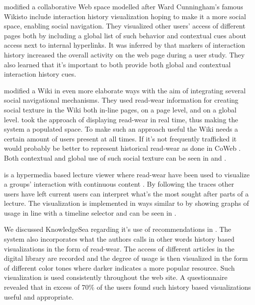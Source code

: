 \citet{dieberger00a} modified \dash{}a collaborative Web space
modelled after Ward Cunningham's famous Wikis\dash{}to include interaction
history visualization hoping to make it a more social space, enabling social
navigation. They visualized other users' access of different pages both by
including a global list of such behavior and contextual cues about access
next to internal hyperlinks.
It was inferred by \citeauthor{dieberger00a} that markers of interaction
history increased the overall activity on the web page during a user study.
They also learned that it's important to both provide both global and
contextual interaction history cues.

\citet{xu06} modified a Wiki in even more elaborate ways
with the aim of integrating several social navigational mechanisms.
They used read-wear information for creating social
texture in the Wiki both in-line pages, on a page level, and on a global
level. \citeauthor{xu06} took the approach of displaying read-wear in real
time, thus making the system a populated space. To make such an approach
useful the Wiki needs a certain amount of users present at all times. If
it's not frequently trafficked it would probably be better to represent
historical read-wear as done in CoWeb \citep[]{dieberger00a}. Both
contextual and global use of such social texture can be seen in
 and .

 is a hypermedia based lecture viewer where read-wear
have been used to visualize a groups' interaction with continuous content
\citep{mertens06}. By following the traces other users have left current users
can interpret what's the most sought after parts of a lecture. The
visualization is implemented in ways similar to \citet{hill92} by showing
graphs of usage in line with a timeline selector and can be seen in
.

We discussed KnowledgeSea regarding it's use of recommendations in
.
The system also incorporates what the authors calls
\citep[]{brusilovsky05}\dash{}in other words history based
visualizations in the form of read-wear. The access of different articles in
the digital library are recorded and the degree of usage is then visualized in
the form of different color tones where darker indicates a more popular
resource. Such visualization is used consistently throughout the web site. A
questionnaire revealed that in excess of 70\%
\citeyearpar[p.15]{brusilovsky05} of the users
found such history based visualizations useful and appropriate.

